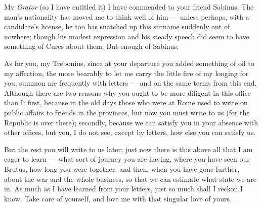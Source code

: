 

 My \textit{Orator} (so I have entitled it) I have commended to your friend Sabinus. The man's nationality has moved me to think well of him --- unless perhaps, with a candidate's license, he too has snatched up this surname suddenly out of nowhere; though his modest expression and his steady speech did seem to have something of Cures about them. But enough of Sabinus.

 As for you, my Trebonius, since at your departure you added something of oil to my affection, the more bearably to let me carry the little fire of my longing for you, summon me frequently with letters --- and on the same terms from this end. Although there are two reasons why you ought to be more diligent in this office than I: first, because in the old days those who were at Rome used to write on public affairs to friends in the provinces, but now you must write to us (for the Republic is over there); secondly, because we can satisfy you in your absence with other offices, but you, I do not see, except by letters, how else you can satisfy us.

 But the rest you will write to us later; just now there is this above all that I am eager to learn --- what sort of journey you are having, where you have seen our Brutus, how long you were together; and then, when you have gone further, about the war and the whole business, so that we can estimate what state we are in. As much as I have learned from your letters, just so much shall I reckon I know. Take care of yourself, and love me with that singular love of yours.
